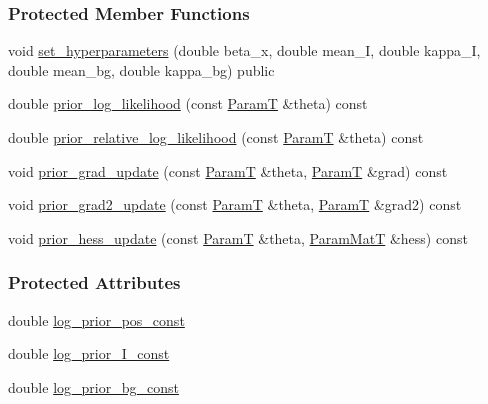 \subsubsection*{Protected Member Functions}
\begin{DoxyCompactItemize}
\item 
void \hyperlink{classmappel_1_1PriorMAP1DObjective_ac5b20bb93fe2f2eddd75d19bf34283c7}{set\+\_\+hyperparameters} (double beta\+\_\+x, double mean\+\_\+I, double kappa\+\_\+I, double mean\+\_\+bg, double kappa\+\_\+bg) public
\item 
double \hyperlink{classmappel_1_1PriorMAP1DObjective_a3cb80b4c435d260e1a62ba666fbbb787}{prior\+\_\+log\+\_\+likelihood} (const \hyperlink{classmappel_1_1PriorMAP1DObjective_a7be5932169c2c7c9d55a89cc20bbce20}{ParamT} \&theta) const 
\item 
double \hyperlink{classmappel_1_1PriorMAP1DObjective_a08683df7a96febdeca35291129291b6d}{prior\+\_\+relative\+\_\+log\+\_\+likelihood} (const \hyperlink{classmappel_1_1PriorMAP1DObjective_a7be5932169c2c7c9d55a89cc20bbce20}{ParamT} \&theta) const 
\item 
void \hyperlink{classmappel_1_1PriorMAP1DObjective_ae12cf228193e345f3382bc916e3c60ee}{prior\+\_\+grad\+\_\+update} (const \hyperlink{classmappel_1_1PriorMAP1DObjective_a7be5932169c2c7c9d55a89cc20bbce20}{ParamT} \&theta, \hyperlink{classmappel_1_1PriorMAP1DObjective_a7be5932169c2c7c9d55a89cc20bbce20}{ParamT} \&grad) const 
\item 
void \hyperlink{classmappel_1_1PriorMAP1DObjective_af21177beb6afa9a865289f4d49362d55}{prior\+\_\+grad2\+\_\+update} (const \hyperlink{classmappel_1_1PriorMAP1DObjective_a7be5932169c2c7c9d55a89cc20bbce20}{ParamT} \&theta, \hyperlink{classmappel_1_1PriorMAP1DObjective_a7be5932169c2c7c9d55a89cc20bbce20}{ParamT} \&grad2) const 
\item 
void \hyperlink{classmappel_1_1PriorMAP1DObjective_af7dd7f0d9c0ccb34b988e63bd356dcfb}{prior\+\_\+hess\+\_\+update} (const \hyperlink{classmappel_1_1PriorMAP1DObjective_a7be5932169c2c7c9d55a89cc20bbce20}{ParamT} \&theta, \hyperlink{classmappel_1_1PriorMAP1DObjective_a6bd7c5f78d8bd65ed513003a7289d92f}{Param\+MatT} \&hess) const 
\end{DoxyCompactItemize}
\subsubsection*{Protected Attributes}
\begin{DoxyCompactItemize}
\item 
double \hyperlink{classmappel_1_1PriorMAP1DObjective_a9a1ba969ca0a2cd0a4eba7b4ae34156d}{log\+\_\+prior\+\_\+pos\+\_\+const}
\item 
double \hyperlink{classmappel_1_1PriorMAP1DObjective_a1cd270ee031e90604e7be0ddcce86026}{log\+\_\+prior\+\_\+\+I\+\_\+const}
\item 
double \hyperlink{classmappel_1_1PriorMAP1DObjective_a101d01f84012e41cdd864d04a8dfc38f}{log\+\_\+prior\+\_\+bg\+\_\+const}
\end{DoxyCompactItemize}


